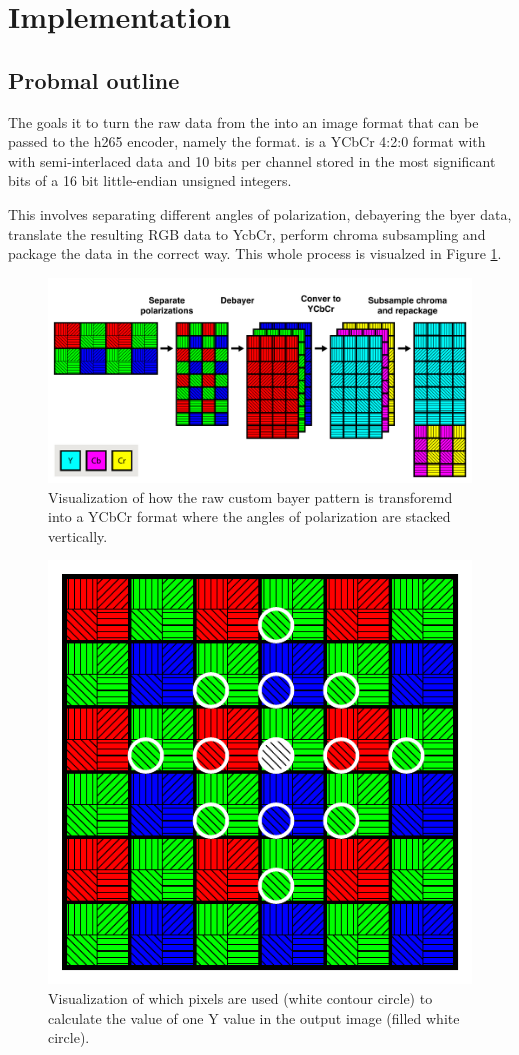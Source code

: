\section{Implementation}

\subsection{Probmal outline}
The goals it to turn the raw data from the \cams into an image format that can be passed to the \gls{h265} encoder, namely the  format.
 is a YCbCr 4:2:0 format with with semi-interlaced data and 10 bits per channel stored in the most significant bits of a 16 bit little-endian unsigned integers.

This involves separating different angles of polarization, debayering the byer data, translate the resulting RGB data to YcbCr, perform chroma subsampling and package the data in the correct way.
This whole process is visualzed in Figure \ref{fig:transform}.

\begin{figure}[H]
    \centering
    \includegraphics[width=\textwidth]{figures/polarized_image/transform.pdf}
    \caption{Visualization of how the raw custom bayer pattern is transforemd into a YCbCr format where the angles of polarization are stacked vertically.}
    \label{fig:transform}
\end{figure}

\begin{figure}[H]
    \centering
    \includegraphics[width=.5\textwidth]{figures/polarized_image/normal_conv.pdf}
    \caption{Visualization of which pixels are used (white contour circle) to calculate the value of one Y value in the output image (filled white circle).}
    \label{fig:saperation}
\end{figure}



